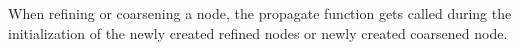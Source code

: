 When refining or coarsening a node, the propagate function gets called during the initialization of the newly created refined nodes or newly created coarsened node.

